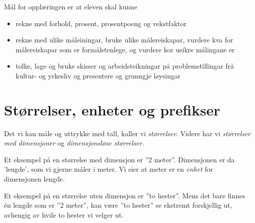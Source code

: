 



Mål for opplæringen er at eleven skal kunne
\begin{itemize}
	\item rekne med forhold, prosent, prosentpoeng og vekstfaktor
\item rekne med ulike måleiningar, bruke ulike målereiskapar, vurdere kva for målereiskapar som er formålstenlege, og vurdere kor usikre målingane er	
\item tolke, lage og bruke skisser og arbeidsteikningar på problemstillingar frå kultur- og yrkesliv og presentere og grunngje løysingar
\end{itemize}	
\newpage
\section{Størrelser, enheter og prefikser}
Det vi kan måle og uttrykke med tall, kaller vi \textit{størrelser}. Videre har vi \textit{størrelser med dimensjoner} og \textit{dimensjonsløse størrelser}.\vsk

Et eksempel på en størrelse med dimensjon er ''2 meter''. Dimensjonen er da 'lengde', som vi gjerne måler i meter. Vi sier at meter er en \textit{enhet} for dimensjonen lengde.\vsk

Et eksempel på en størrelse uten dimensjon er ''to hester''. Mens det bare finnes én lengde som er ''2 meter'', kan være ''to hester'' se ekstremt forskjellig ut, avhengig av hvile to hester vi velger ut.\vsk

